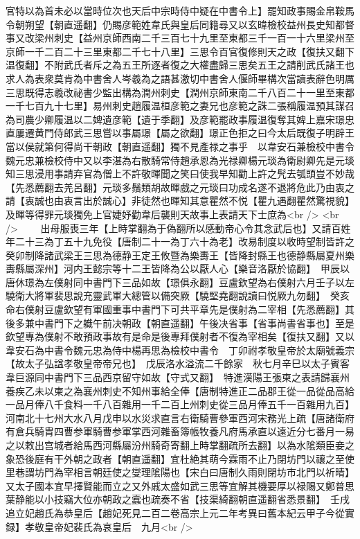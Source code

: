 官特以為首未必以當時位次也天后中宗時侍中疑在中書令上】罷知政事賜金帛鞍馬令朝朔望【朝直遥翻】仍賜彦範姓韋氏與皇后同籍尋又以玄暐檢校益州長史知都督事又改梁州刺史【益州京師西南二千三百七十九里至東都三千一百一十六里梁州至京師一千二百二十三里東都二千七十八里】三思令百官復修則天之政【復扶又翻下温復翻】不附武氏者斥之為五王所逐者復之大權盡歸三思矣五王之請削武氏諸王也求人為表衆莫肯為中書舍人岑羲為之語甚激切中書舍人偃師畢構次當讀表辭色明厲三思既得志羲改祕書少監出構為潤州刺史【潤州京師東南二千八百二十一里至東都一千七百九十七里】易州刺史趙履温桓彦範之妻兄也彦範之誅二張稱履温預其謀召為司農少卿履温以二婢遺彦範【遺于季翻】及彦範罷政事履温復奪其婢上嘉宋璟忠直屢遷黄門侍郎武三思嘗以事屬璟【屬之欲翻】璟正色拒之曰今太后既復子明辟王當以侯就第何得尚干朝政【朝直遥翻】獨不見產禄之事乎　以韋安石兼檢校中書令魏元忠兼檢校侍中又以李湛為右散騎常侍趙承恩為光禄卿楊元琰為衛尉卿先是元琰知三思浸用事請弃官為僧上不許敬暉聞之笑曰使我早知勸上許之髠去瓠頭豈不妙哉【先悉薦翻去羌呂翻】元琰多鬚類胡故暉戲之元琰曰功成名遂不退將危此乃由衷之請【衷誠也由衷言出於誠心】非徒然也暉知其意瞿然不悦【瞿九遇翻瞿然驚視貌】及暉等得罪元琰獨免上官婕妤勸韋后襲則天故事上表請天下士庶為<br />
<br />
　　出母服喪三年【上時掌翻為于偽翻所以感動帝心令其念武后也】又請百姓年二十三為丁五十九免役【唐制二十一為丁六十為老】改易制度以收時望制皆許之　癸卯制降諸武梁王三思為德静王定王攸暨為樂夀王【皆降封縣王也德静縣屬夏州樂夀縣屬深州】河内王懿宗等十二王皆降為公以厭人心【樂音洛厭於協翻】　甲辰以唐休璟為左僕射同中書門下三品如故【璟俱永翻】豆盧欽望為右僕射六月壬子以左驍衛大將軍裴思說充靈武軍大總管以備突厥【驍堅堯翻說讀曰悦厥九勿翻】　癸亥命右僕射豆盧欽望有軍國重事中書門下可共平章先是僕射為二宰相【先悉薦翻】其後多兼中書門下之軄午前决朝政【朝直遥翻】午後决省事【省事尚書省事也】至是欽望專為僕射不敢預政事故有是命是後專拜僕射者不復為宰相矣【復扶又翻】又以韋安石為中書令魏元忠為侍中楊再思為檢校中書令　丁卯祔孝敬皇帝於太廟號義宗【故太子弘諡孝敬皇帝帝兄也】　戊辰洛水溢流二千餘家　秋七月辛巳以太子賓客韋巨源同中書門下三品西京留守如故【守式又翻】　特進漢陽王張柬之表請歸襄州養疾乙未以柬之為襄州刺史不知州事給全俸【唐制特進正二品郡王從一品從品高給一品月俸八千食料一千八百雜用一千二百上州刺史從三品月俸五千一百雜用九百】　河南北十七州大水八月戊申以水災求直言右衛騎曹參軍西河宋務光上疏【唐諸衛府有倉兵騎胄四曹参軍騎曹参軍掌西河雜畜簿帳牧養凡府馬承直以遠近分七番月一易之以敕出宫城者給馬西河縣屬汾州騎奇寄翻上時掌翻疏所去翻】以為水隂類臣妾之象恐後庭有干外朝之政者【朝直遥翻】宜杜絶其萌今霖雨不止乃閉坊門以禳之至使里巷謂坊門為宰相言朝廷使之燮理隂陽也【宋白曰唐制久雨則閉坊市北門以祈晴】又太子國本宜早擇賢能而立之又外戚太盛如武三思等宜解其機要厚以禄賜又鄭普思葉静能以小技竊大位亦朝政之蠧也疏奏不省【技渠綺翻朝直遥翻省悉景翻】　壬戌追立妃趙氏為恭皇后【趙妃死見二百二卷高宗上元二年考異曰舊本紀云甲子今從實録】孝敬皇帝妃裴氏為哀皇后　九月<br />
